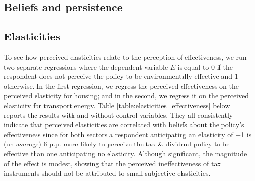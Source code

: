 \documentclass[12pt]{article} %
\begin{document}
\begin{appendices}


\section{Beliefs and persistence\label{sec:app_perception}}

\subsection{Elasticities}



To see how perceived elasticities relate to the perception of effectiveness, we run two separate regressions where the dependent variable $E$ is equal to 0 if the respondent does not perceive the policy to be environmentally effective and 1 otherwise. In the first regression, we regress the perceived effectiveness on the perceived elasticity for housing; and in the second, we regress it on the perceived elasticity for transport energy. Table \ref{table:elasticities_effectiveness} below reports the results with and without control variables. They all consistently indicate that perceived elasticities are correlated with beliefs about the policy's effectiveness since for both sectors a respondent anticipating an elasticity of $-$1 is (on average) 6 p.p. more likely to perceive the tax \& dividend policy to be effective than one anticipating no elasticity. Although significant, the magnitude of the effect is modest, showing that the perceived ineffectiveness of tax instruments should not be attributed to small subjective elasticities.


\end{appendices}
\end{document}
